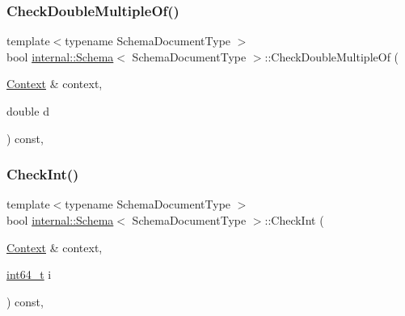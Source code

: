 \subsubsection{\texorpdfstring{Check\+Double\+Multiple\+Of()}{CheckDoubleMultipleOf()}}
{\footnotesize\ttfamily template$<$typename Schema\+Document\+Type $>$ \\
bool \hyperlink{classinternal_1_1Schema}{internal\+::\+Schema}$<$ Schema\+Document\+Type $>$\+::Check\+Double\+Multiple\+Of (\begin{DoxyParamCaption}\item[{\hyperlink{classinternal_1_1Schema_ac3f54abfefe300c5610c1205869cfd66}{Context} \&}]{context,  }\item[{double}]{d }\end{DoxyParamCaption}) const\hspace{0.3cm}{\ttfamily [inline]}, {\ttfamily [private]}}

\mbox{\label{classinternal_1_1Schema_a6d1f3ada8d8151319b1db505352651e6}} 
\subsubsection{\texorpdfstring{Check\+Int()}{CheckInt()}}
{\footnotesize\ttfamily template$<$typename Schema\+Document\+Type $>$ \\
bool \hyperlink{classinternal_1_1Schema}{internal\+::\+Schema}$<$ Schema\+Document\+Type $>$\+::Check\+Int (\begin{DoxyParamCaption}\item[{\hyperlink{classinternal_1_1Schema_ac3f54abfefe300c5610c1205869cfd66}{Context} \&}]{context,  }\item[{\hyperlink{stdint_8h_a414156feea104f8f75b4ed9e3121b2f6}{int64\+\_\+t}}]{i }\end{DoxyParamCaption}) const\hspace{0.3cm}{\ttfamily [inline]}, {\ttfamily [private]}}

\mbox{\label{classinternal_1_1Schema_a0ac91a6f4d1e3d6267fb9656d84f275a}} 
